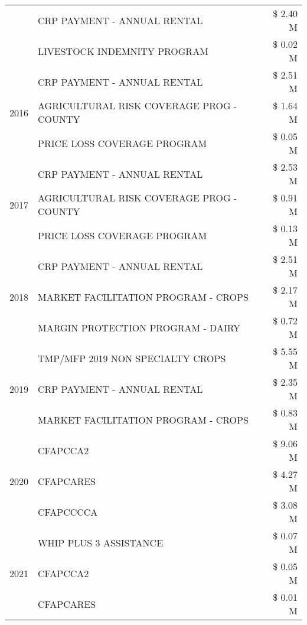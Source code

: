 \begin{tabular}{llr}
 & CRP PAYMENT - ANNUAL RENTAL & \$ 2.40 M \\
 & LIVESTOCK INDEMNITY PROGRAM & \$ 0.02 M \\
\cline{1-3}
\multirow[t]{3}{*}{2016} & CRP PAYMENT - ANNUAL RENTAL & \$ 2.51 M \\
 & AGRICULTURAL RISK COVERAGE PROG - COUNTY & \$ 1.64 M \\
 & PRICE LOSS COVERAGE PROGRAM & \$ 0.05 M \\
\cline{1-3}
\multirow[t]{3}{*}{2017} & CRP PAYMENT - ANNUAL RENTAL & \$ 2.53 M \\
 & AGRICULTURAL RISK COVERAGE PROG - COUNTY & \$ 0.91 M \\
 & PRICE LOSS COVERAGE PROGRAM & \$ 0.13 M \\
\cline{1-3}
\multirow[t]{3}{*}{2018} & CRP PAYMENT - ANNUAL RENTAL & \$ 2.51 M \\
 & MARKET FACILITATION PROGRAM - CROPS & \$ 2.17 M \\
 & MARGIN PROTECTION PROGRAM - DAIRY & \$ 0.72 M \\
\cline{1-3}
\multirow[t]{3}{*}{2019} & TMP/MFP 2019 NON SPECIALTY CROPS & \$ 5.55 M \\
 & CRP PAYMENT - ANNUAL RENTAL & \$ 2.35 M \\
 & MARKET FACILITATION PROGRAM - CROPS & \$ 0.83 M \\
\cline{1-3}
\multirow[t]{3}{*}{2020} & CFAPCCA2 & \$ 9.06 M \\
 & CFAPCARES & \$ 4.27 M \\
 & CFAPCCCCA & \$ 3.08 M \\
\cline{1-3}
\multirow[t]{3}{*}{2021} & WHIP PLUS 3 ASSISTANCE & \$ 0.07 M \\
 & CFAPCCA2 & \$ 0.05 M \\
 & CFAPCARES & \$ 0.01 M \\
\cline{1-3}
\bottomrule
\end{tabular}
